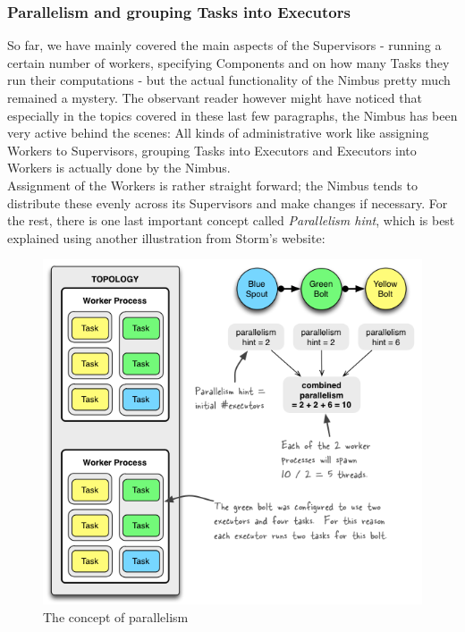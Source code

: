 \documentclass[12pt,a4paper]{article}
\begin{document}
\subsubsection{Parallelism and grouping Tasks into Executors}

So far, we have mainly covered the main aspects of the Supervisors - running a certain number of workers, specifying Components and on how many Tasks they run their computations - but the actual functionality of the Nimbus pretty much remained a mystery. The observant reader however might have noticed that especially in the topics covered in these last few paragraphs, the Nimbus has been very active behind the scenes: All kinds of administrative work like assigning Workers to Supervisors, grouping Tasks into Executors and Executors into Workers is actually done by the Nimbus.\\
\indent Assignment of the Workers is rather straight forward; the Nimbus tends to distribute these evenly across its Supervisors and make changes if necessary. For the rest, there is one last important concept called \textit{Parallelism hint}, which is best explained using another illustration from Storm's website:\\
\begin{figure}[H]
\begin{center}
\includegraphics[scale=1]{images/example-of-a-running-topology.png}
\end{center}
\caption{The concept of parallelism}
\end{figure}
\end{document}
